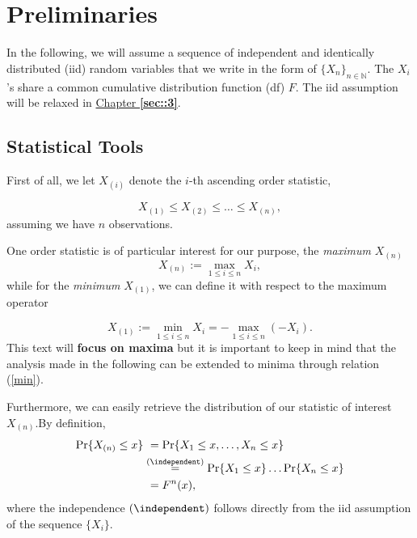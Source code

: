 
\section{Preliminaries}\label{sec::1.1}


In the following, we will assume a sequence of independent and identically distributed (iid) random variables that we write in the form of $\{X_n\}_{n\in\mathbb{N}}$. The $X_i$'s share a common cumulative distribution function (df) $F$. The iid assumption will be relaxed in \hyperref[sec::3]{Chapter \textbf{\ref{sec::3}}}.


\subsection*{Statistical Tools}
First of all, we let $X_{(i)} $ denote the $i$-th ascending order statistic,

\begin{equation} \label{ordereds}
X_{(1)}\leq X_{(2)}\leq \ldots \leq X_{(n)},
\end{equation}
assuming we have $n$ observations.

One order statistic is of particular interest for our purpose, the \emph{maximum} $X_{(n)}$
\begin{equation} \label{max}
X_{(n)}:=\displaystyle{\max_{1\leq i\leq n}}X_i,
\end{equation}
while for the \emph{minimum} $X_{(1)}$, we can define it with respect to the maximum operator

\begin{equation}\label{min}
X_{(1)}:=\displaystyle{\min_{1\leq i\leq n}}X_i=- \displaystyle{\max_{1\leq i\leq n}}(-X_i).
\end{equation}
This text will \textbf{focus on maxima} but it is important to keep in mind that the analysis made in the following can be extended to minima through relation (\ref{min}).

Furthermore, we can easily retrieve the distribution of our statistic of interest $X_{(n)}$.By definition,
\begin{equation}\label{maxdist}
\begin{aligned}
\text{Pr}\{X_{(n)}\leq x\} & \ =\text{Pr}\{X_1 \leq x, \ldots, X_n \leq x\} \\ &\stackrel{(\independent)}{=}\text{Pr}\{X_1\leq x\}\dots\text{Pr}\{X_n\leq x\} \\
&\ =F^n(x),
\end{aligned}
\end{equation}
where the independence $(\independent)$  follows directly from the iid assumption of the sequence $\{X_i\}$.



